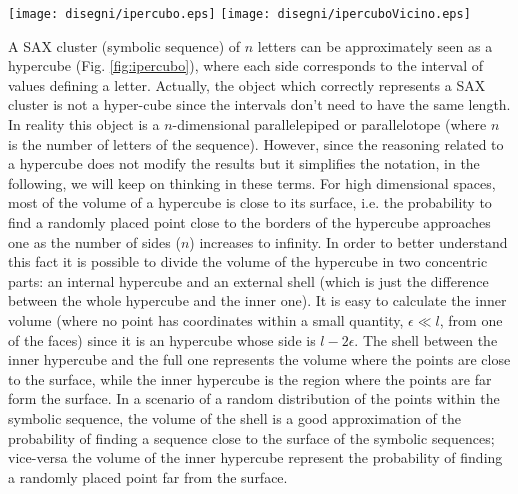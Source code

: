 \documentclass[a4paper,twoside]{article}
\begin{document}
\begin{figure*}
 \texttt{[image: disegni/ipercubo.eps]}
 \texttt{[image: disegni/ipercuboVicino.eps]}
 \caption{(Left) A 3-dimensional parallelepiped corresponding to the symbolic sequence \textit{bbc}, and a point whose coordinates are averages  of the subsequences. (Right) The nearest neighbor of one point of the \textit{bbc} symbolic sequence is in the next cluster \textit{bcc}, this suggests that the sequences giving rise to those points might be closest Euclidean neighbors but belonging to different SAX symbolic sequences.}\label{fig:ipercubo}
\end{figure*}



A SAX cluster (symbolic sequence) of $n$ letters can be approximately seen as a hypercube (Fig. \ref{fig:ipercubo}), where each side corresponds to the interval of values defining a letter.
%
Actually, the object which correctly represents a SAX cluster is not a hyper-cube since the intervals don't need to have the same length. In reality this object is a $n$-dimensional parallelepiped or parallelotope (where $n$ is the number of letters of the sequence). However, since the reasoning related to a  hypercube does not modify the results but it simplifies the notation, in the following, we will keep on thinking in these terms.
%
For high dimensional spaces, most of the volume of a hypercube is close to its surface, i.e. the probability to find a randomly placed point close to the borders of the hypercube approaches one as the number of sides ($n$) increases to infinity.  %
%
In order to better understand this fact it is possible to divide the volume of the hypercube in two concentric parts: an internal hypercube and an external shell (which is just the difference between the whole hypercube and the inner one). 
%
It is easy to calculate the inner volume (where no point has coordinates within a small quantity, $\epsilon\ll l$, from one of the faces) since it is an hypercube whose side is $l-2\epsilon$. 
The shell between the inner hypercube and the full one represents the volume where the points are close to the surface, while the inner hypercube is the region where the points are far form the surface. In a scenario of a random distribution of the points within the symbolic sequence, the volume of the shell is a good approximation of the probability of finding a sequence close to the surface of the symbolic sequences; vice-versa the volume of the inner hypercube represent the probability of finding a randomly placed point far from the surface. 
\end{document}
